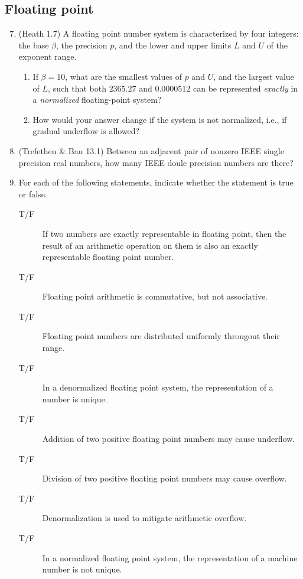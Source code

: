 \documentclass{article}
\begin{document}
\subsection*{Floating point}
\begin{enumerate}
\setcounter{enumi}{6}
\item (Heath 1.7) A floating point number system is characterized by four integers: the base $\beta$, the precision $p$,
  and the lower and upper limits $L$ and $U$ of the exponent range.  
\begin{enumerate}
\item If $\beta =10$, what are the smallest values of $p$
  and $U$, and the largest value of $L$, such that both $2365.27$ and $0.0000512$ can be represented \emph{exactly} in a
  \emph{normalized} floating-point system?
\item How would your answer change if the system is not normalized, i.e., if gradual underflow is allowed?
\end{enumerate}
\item (Trefethen \& Bau 13.1) Between an adjacent pair of nonzero IEEE single precision real numbers, how many IEEE
  doule precision numbers are there?

\item For each of the following statements, indicate whether the statement is true or false.
    \begin{description}
    \item[T/F] If two numbers are exactly representable in floating point, then the result of an arithmetic operation on them is also an exactly representable floating point number.
    \item[T/F] Floating point arithmetic is commutative, but not associative.
    \item[T/F] Floating point numbers are distributed uniformly througout their range.
    \item[T/F] In a denormalized floating point system, the representation of a number is unique.
    \item[T/F] Addition of two positive floating point numbers may cause underflow.
    \item[T/F] Division of two positive floating point numbers may cause overflow.
    \item[T/F] Denormalization is used to mitigate arithmetic overflow.
    \item[T/F] In a normalized floating point system, the representation of a machine number is not unique.
    \end{description}


\end{enumerate}
\end{document}
